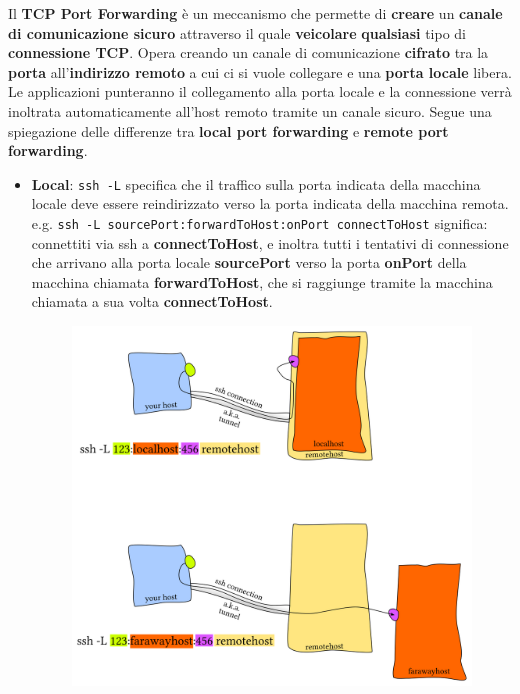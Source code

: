 \documentclass[11pt,a4paper,oneside]{book}
\theoremstyle{definition}
\begin{document}
Il \textbf{TCP Port Forwarding} è un meccanismo che permette di \textbf{creare} un \textbf{canale di comunicazione sicuro} attraverso il quale \textbf{veicolare} \textbf{qualsiasi} tipo di \textbf{connessione TCP}. Opera creando un canale di comunicazione \textbf{cifrato} tra la \textbf{porta} all’\textbf{indirizzo remoto} a cui ci si vuole collegare e una \textbf{porta locale} libera. Le applicazioni punteranno il collegamento alla porta locale e la connessione verrà inoltrata automaticamente all’host remoto
tramite un canale sicuro. \newline Segue una spiegazione delle differenze tra \textbf{local port forwarding} e \textbf{remote port forwarding}.

\pagebreak

\begin{itemize}
	\item \textbf{Local}: \texttt{ssh -L} specifica che il traffico sulla porta indicata della macchina locale deve essere reindirizzato verso la porta indicata della macchina remota. \newline
	      e.g. \texttt{ssh -L sourcePort:forwardToHost:onPort connectToHost} significa: connettiti via ssh a \textbf{connectToHost}, e inoltra tutti i tentativi di connessione che arrivano alla porta locale \textbf{sourcePort} verso la porta \textbf{onPort} della macchina chiamata \textbf{forwardToHost}, che si raggiunge tramite la macchina chiamata a sua volta \textbf{connectToHost}.
	      \begin{figure}[!h]
		      \includegraphics[scale=0.8]{Immagini/Local_ssh.png}
		      \centering
	      \end{figure}


\end{itemize}
\end{document}
